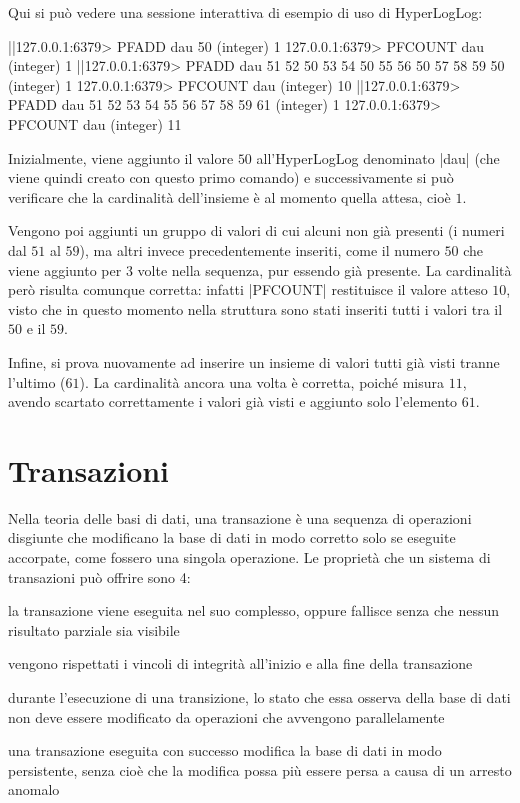 Qui si può vedere una sessione interattiva di esempio di uso di HyperLogLog:

\begin{commentedsource}[style=redis]
|\lnote|127.0.0.1:6379> PFADD dau 50
(integer) 1
127.0.0.1:6379> PFCOUNT dau
(integer) 1
|\lnote|127.0.0.1:6379> PFADD dau 51 52 50 53 54 50 55 56 50 57 58 59 50
(integer) 1
127.0.0.1:6379> PFCOUNT dau
(integer) 10
|\lnote|127.0.0.1:6379> PFADD dau 51 52 53 54 55 56 57 58 59 61
(integer) 1
127.0.0.1:6379> PFCOUNT dau
(integer) 11
\end{commentedsource}

Inizialmente, viene aggiunto il valore $50$ all'HyperLogLog denominato \cverb|dau|  (che
viene quindi creato con questo primo comando) e successivamente si può verificare che la
cardinalità dell'insieme è al momento quella attesa, cioè $1$.

Vengono poi aggiunti un gruppo di valori  di cui alcuni non già presenti (i numeri dal $51$
al $59$), ma altri invece precedentemente inseriti, come il numero $50$ che viene aggiunto per 3
volte nella sequenza, pur essendo già presente. La cardinalità però risulta comunque corretta:
infatti \cverb|PFCOUNT| restituisce il valore atteso $10$, visto che in questo momento nella
struttura sono stati inseriti tutti i valori tra il $50$ e il $59$.

Infine, si prova nuovamente ad inserire un insieme di valori  tutti già visti tranne
l'ultimo ($61$). La cardinalità ancora una volta è corretta, poiché misura $11$, avendo scartato
correttamente i valori già visti e aggiunto solo l'elemento $61$.

\section{Transazioni}

Nella teoria delle basi di dati, una transazione è una sequenza di operazioni disgiunte che
modificano la base di dati in modo corretto solo se eseguite accorpate, come fossero una singola
operazione. Le proprietà che un sistema di transazioni può offrire sono 4: 
\begin{description}[labelindent=2\parindent,leftmargin=!,labelwidth=6em,font={\normalfont\bfseries}]
	\item[Atomicità] la transazione viene eseguita nel suo complesso, oppure fallisce senza che
		nessun risultato parziale sia visibile
	\item[Coerenza] vengono rispettati i vincoli di integrità all'inizio e alla fine della
		transazione
	\item[Isolamento] durante l'esecuzione di una transizione, lo stato che essa osserva della base
		di dati non deve essere modificato da operazioni che avvengono parallelamente
	\item[Durabilità] una transazione eseguita con successo modifica la base di dati in modo
		persistente, senza cioè che la modifica possa più essere persa a causa di un arresto
		anomalo
\end{description}

